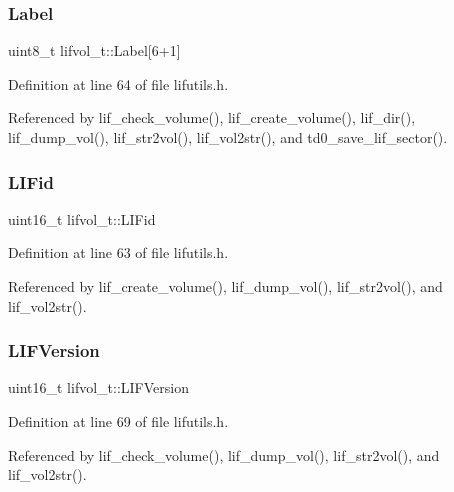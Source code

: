 \subsubsection{\texorpdfstring{Label}{Label}}
{\footnotesize\ttfamily uint8\+\_\+t lifvol\+\_\+t\+::\+Label\mbox{[}6+1\mbox{]}}



Definition at line 64 of file lifutils.\+h.



Referenced by lif\+\_\+check\+\_\+volume(), lif\+\_\+create\+\_\+volume(), lif\+\_\+dir(), lif\+\_\+dump\+\_\+vol(), lif\+\_\+str2vol(), lif\+\_\+vol2str(), and td0\+\_\+save\+\_\+lif\+\_\+sector().

\mbox{\label{structlifvol__t_adb6a0c2fff5b765eb12c3eb5db6d5bad}} 
\subsubsection{\texorpdfstring{L\+I\+Fid}{LIFid}}
{\footnotesize\ttfamily uint16\+\_\+t lifvol\+\_\+t\+::\+L\+I\+Fid}



Definition at line 63 of file lifutils.\+h.



Referenced by lif\+\_\+create\+\_\+volume(), lif\+\_\+dump\+\_\+vol(), lif\+\_\+str2vol(), and lif\+\_\+vol2str().

\mbox{\label{structlifvol__t_afffd824a7b0ce6aa8410fa243733475f}} 
\subsubsection{\texorpdfstring{L\+I\+F\+Version}{LIFVersion}}
{\footnotesize\ttfamily uint16\+\_\+t lifvol\+\_\+t\+::\+L\+I\+F\+Version}



Definition at line 69 of file lifutils.\+h.



Referenced by lif\+\_\+check\+\_\+volume(), lif\+\_\+dump\+\_\+vol(), lif\+\_\+str2vol(), and lif\+\_\+vol2str().

\mbox{\label{structlifvol__t_ad245f7419e180934262f53acd9b4349c}} 
